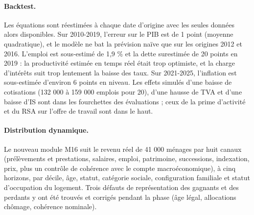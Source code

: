 \paragraph{Backtest.} Les équations sont réestimées à chaque date d'origine avec les seules données alors disponibles.
Sur 2010-2019, l'erreur sur le PIB est de 1 point (moyenne quadratique), et le modèle ne bat la prévision naïve que sur
les origines 2012 et 2016. L'emploi est sous-estimé de 1,9 \% et la dette surestimée de 20 points en 2019 : la
productivité estimée en temps réel était trop optimiste, et la charge d'intérêts suit trop lentement la baisse des
taux. Sur 2021-2025, l'inflation est sous-estimée d'environ 6 points en niveau. Les effets simulés d'une baisse de
cotisations (132 000 à 159 000 emplois pour 20\md), d'une hausse de TVA et d'une baisse d'IS sont dans les fourchettes
des évaluations ; ceux de la prime d'activité et du RSA sur l'offre de travail sont dans le haut.

\paragraph{Distribution dynamique.} Le nouveau module M16 suit le revenu réel de 41 000 ménages par huit canaux
(prélèvements et prestations, salaires, emploi, patrimoine, successions, indexation, prix, plus un contrôle de cohérence
avec le compte macroéconomique), à cinq horizons, par décile, âge, statut, catégorie sociale, configuration familiale et
statut d'occupation du logement. Trois défauts de représentation des gagnants et des perdants y ont été trouvés et
corrigés pendant la phase (âge légal, allocations chômage, cohérence nominale).

